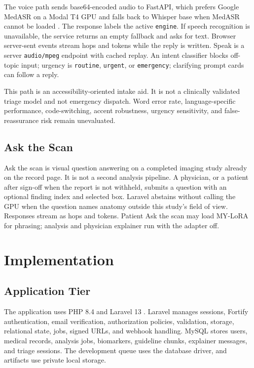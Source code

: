 \documentclass[conference]{IEEEtran}
\begin{document}
The voice path sends base64-encoded audio to FastAPI, which prefers Google MedASR on a Modal T4 GPU and falls back to Whisper base when MedASR cannot be loaded \cite{radford2023whisper}. The response labels the active \texttt{engine}. If speech recognition is unavailable, the service returns an empty fallback and asks for text. Browser server-sent events stream hops and tokens while the reply is written. Speak is a server \texttt{audio/mpeg} endpoint with cached replay. An intent classifier blocks off-topic input; urgency is \texttt{routine}, \texttt{urgent}, or \texttt{emergency}; clarifying prompt cards can follow a reply.

This path is an accessibility-oriented intake aid. It is not a clinically validated triage model and not emergency dispatch. Word error rate, language-specific performance, code-switching, accent robustness, urgency sensitivity, and false-reassurance risk remain unevaluated.

\subsection{Ask the Scan}

Ask the scan is visual question answering on a completed imaging study already on the record page. It is not a second analysis pipeline. A physician, or a patient after sign-off when the report is not withheld, submits a question with an optional finding index and selected box. Laravel abstains without calling the GPU when the question names anatomy outside this study's field of view. Responses stream as hops and tokens. Patient Ask the scan may load MY-LoRA for phrasing; analysis and physician explainer run with the adapter off.

\section{Implementation}

\subsection{Application Tier}

The application uses PHP 8.4 and Laravel 13 \cite{laravel13}. Laravel manages sessions, Fortify authentication, email verification, authorization policies, validation, storage, relational state, jobs, signed URLs, and webhook handling. MySQL stores users, medical records, analysis jobs, biomarkers, guideline chunks, explainer messages, and triage sessions. The development queue uses the database driver, and artifacts use private local storage.
\end{document}
